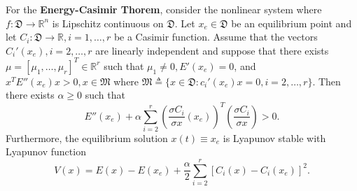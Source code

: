 \documentclass[a4paper]{report}
\theoremstyle{definition}
\begin{document}
\begin{mdframed}[backgroundcolor=airforceblue!25] 
For the \textbf{Energy-Casimir Thorem}, consider the nonlinear system where $f:\mathfrak{D}\rightarrow\mathbb{R}^n$ is Lipschitz continuous on $\mathfrak{D}$. Let $x_e\in\mathfrak{D}$ be an equilibrium point and let $C_i:\mathfrak{D}\rightarrow\mathbb{R}, i=1,\dots,r$ be a Casimir function. Assume that the vectors $C_i'(x_e), i=2,\dots,r$ are linearly independent and suppose that there exists $\mu=[\mu_1,\dots,\mu_r]^T\in\mathbb{R}^r$ such that $\mu_1\not= 0, E'(x_e)=0$, and $x^TE''(x_e)x>0, x\in \mathfrak{M}$ where $\mathfrak{M}\triangleq \{x\in \mathfrak{D}:c_i'(x_e)x=0, i=2,\dots,r\}$. Then there exists $\alpha\ge 0$ such that
\begin{equation}
E''(x_e)+\alpha\sum_{i=2}^{r}(\frac{\sigma C_i}{\sigma x}(x_e))^T(\frac{\sigma C_i}{\sigma x})>0.
\end{equation}
Furthermore, the equilibrium solution $x(t)\equiv x_e$ is Lyapunov stable with Lyapunov function
\begin{equation}
V(x)=E(x)-E(x_e)+\frac{\alpha}{2}\sum_{i=2}^{r}[C_i(x)-C_i(x_e)]^2.
\end{equation}
\end{mdframed}
\end{document}
